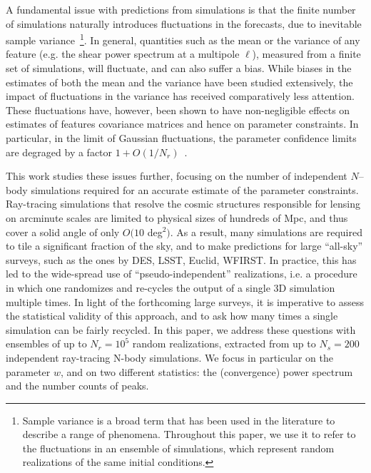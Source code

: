 \documentclass[reprint,aps,prd,superscriptaddress,showkeys,showpacs]{revtex4-1}
\begin{document}
A fundamental issue with predictions from simulations is that the
finite number of simulations naturally introduces fluctuations in the
forecasts, due to inevitable sample variance~\footnote{Sample variance is a broad term that has been used in the literature to describe a range of phenomena.  Throughout this paper, we use it to refer to the fluctuations in an ensemble of simulations, which represent random realizations of the same initial conditions.}.
In general, quantities such as the mean or the variance of any feature
(e.g. the shear power spectrum at a multipole $\ell$), measured from a
finite set of simulations, will fluctuate, and can also suffer a bias.
While biases in the estimates of both the mean and the variance have
been studied extensively, the impact of fluctuations in the variance
has received comparatively less attention.  These fluctuations have,
however, been shown to have non-negligible effects on estimates of
features covariance matrices and hence on parameter constraints. In
particular, in the limit of Gaussian fluctuations, the parameter
confidence limits are degraged by a factor
$1+O(1/N_r)$~\citep{DodelsonSchneider13,Taylor12}.

This work studies these issues further, focusing on the number of
independent $N$--body simulations required for an accurate estimate of
the parameter constraints.  Ray-tracing simulations that resolve the
cosmic structures responsible for lensing on arcminute scales are
limited to physical sizes of hundreds of Mpc, and thus cover a solid
angle of only $O(10$ deg$^2)$.  As a result, many simulations are
required to tile a significant fraction of the sky, and to make
predictions for large ``all-sky'' surveys, such as the ones by DES,
LSST, Euclid, WFIRST.  In practice, this has led to the wide-spread
use of ``pseudo-independent'' realizations, i.e. a procedure in which
one randomizes and re-cycles the output of a single 3D simulation
multiple times.
In light of the forthcoming large surveys, it is imperative to assess
the statistical validity of this approach, and to ask how many times a
single simulation can be fairly recycled.  In this paper, we address
these questions with ensembles of up to $N_r=10^5$ random
realizations, extracted from up to $N_s=200$ independent ray-tracing
N-body simulations. We focus in particular on the parameter $w$, and
on two different statistics: the (convergence) power spectrum and
the number counts of peaks.
\end{document}
